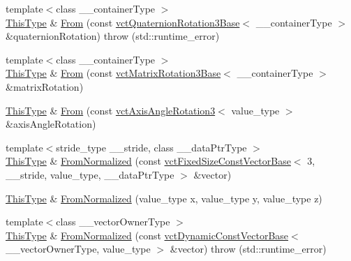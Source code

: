 \begin{DoxyCompactItemize}
\item 
{\footnotesize template$<$class \+\_\+\+\_\+container\+Type $>$ }\\\hyperlink{classvct_rodriguez_rotation3_base_add2bccab7f6e86c98b3f97fd00b06dcc}{This\+Type} \& \hyperlink{classvct_rodriguez_rotation3_base_a317a0fd3a5d680b3436e54ffd43096f3}{From} (const \hyperlink{classvct_quaternion_rotation3_base}{vct\+Quaternion\+Rotation3\+Base}$<$ \+\_\+\+\_\+container\+Type $>$ \&quaternion\+Rotation)  throw (std\+::runtime\+\_\+error)
\item 
{\footnotesize template$<$class \+\_\+\+\_\+container\+Type $>$ }\\\hyperlink{classvct_rodriguez_rotation3_base_add2bccab7f6e86c98b3f97fd00b06dcc}{This\+Type} \& \hyperlink{classvct_rodriguez_rotation3_base_afa5a181794bab85e1df97e24c8808557}{From} (const \hyperlink{classvct_matrix_rotation3_base}{vct\+Matrix\+Rotation3\+Base}$<$ \+\_\+\+\_\+container\+Type $>$ \&matrix\+Rotation)
\item 
\hyperlink{classvct_rodriguez_rotation3_base_add2bccab7f6e86c98b3f97fd00b06dcc}{This\+Type} \& \hyperlink{classvct_rodriguez_rotation3_base_ae4855613df03c83115ecd86a3d610a84}{From} (const \hyperlink{classvct_axis_angle_rotation3}{vct\+Axis\+Angle\+Rotation3}$<$ value\+\_\+type $>$ \&axis\+Angle\+Rotation)
\item 
{\footnotesize template$<$stride\+\_\+type \+\_\+\+\_\+stride, class \+\_\+\+\_\+data\+Ptr\+Type $>$ }\\\hyperlink{classvct_rodriguez_rotation3_base_add2bccab7f6e86c98b3f97fd00b06dcc}{This\+Type} \& \hyperlink{classvct_rodriguez_rotation3_base_a63c0023d2562f13a26d1a82e710d1e42}{From\+Normalized} (const \hyperlink{classvct_fixed_size_const_vector_base}{vct\+Fixed\+Size\+Const\+Vector\+Base}$<$ 3, \+\_\+\+\_\+stride, value\+\_\+type, \+\_\+\+\_\+data\+Ptr\+Type $>$ \&vector)
\item 
\hyperlink{classvct_rodriguez_rotation3_base_add2bccab7f6e86c98b3f97fd00b06dcc}{This\+Type} \& \hyperlink{classvct_rodriguez_rotation3_base_a60a6634404da6f6704f558fa98d5f9df}{From\+Normalized} (value\+\_\+type x, value\+\_\+type y, value\+\_\+type z)
\item 
{\footnotesize template$<$class \+\_\+\+\_\+vector\+Owner\+Type $>$ }\\\hyperlink{classvct_rodriguez_rotation3_base_add2bccab7f6e86c98b3f97fd00b06dcc}{This\+Type} \& \hyperlink{classvct_rodriguez_rotation3_base_a9eee1c65ee9cf13c2bc013e831f5bc37}{From\+Normalized} (const \hyperlink{classvct_dynamic_const_vector_base}{vct\+Dynamic\+Const\+Vector\+Base}$<$ \+\_\+\+\_\+vector\+Owner\+Type, value\+\_\+type $>$ \&vector)  throw (std\+::runtime\+\_\+error)

\end{DoxyCompactItemize}
